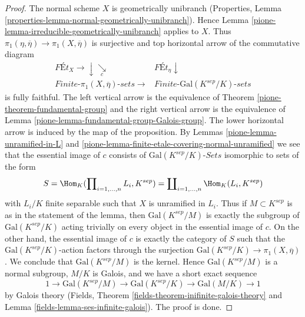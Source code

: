 \begin{proof}

The normal scheme $X$ is geometrically unibranch
(Properties, Lemma \ref{properties-lemma-normal-geometrically-unibranch}).
Hence Lemma \ref{pione-lemma-irreducible-geometrically-unibranch} applies to $X$.
Thus $\pi_1(\eta, \overline{\eta}) \to \pi_1(X, \overline{\eta})$
is surjective and top horizontal arrow of the commutative diagram
$$
\begin{array}{cc}\textit{F\'Et}_X \longrightarrow\downarrow\underset{c}{\searrow} & \textit{F\'Et}_\eta \downarrow \\ \textit{Finite-}\pi_1(X, \overline{\eta})\textit{-sets} \longrightarrow & \textit{Finite-}\text{Gal}(K^{sep}/K)\textit{-sets}\end{array}
$$
is fully faithful. The left vertical arrow is the equivalence of
Theorem \ref{pione-theorem-fundamental-group}
and the right vertical arrow is the equivalence of
Lemma \ref{pione-lemma-fundamental-group-Galois-group}. The lower
horizontal arrow is induced by the map of the proposition.
By Lemmas \ref{pione-lemma-unramified-in-L} and
\ref{pione-lemma-finite-etale-covering-normal-unramified}
we see that the essential image of $c$
consists of $\text{Gal}(K^{sep}/K)\textit{-Sets}$ isomorphic
to sets of the form
$$
S = \Hom_K(\prod\nolimits_{i = 1, \ldots, n} L_i, K^{sep}) =
\coprod\nolimits_{i = 1, \ldots, n} \Hom_K(L_i, K^{sep})
$$
with $L_i/K$ finite separable such that $X$ is unramified in $L_i$.
Thus if $M \subset K^{sep}$ is as in the statement of the lemma,
then $\text{Gal}(K^{sep}/M)$ is exactly the subgroup of
$\text{Gal}(K^{sep}/K)$ acting trivially on every object
in the essential image of $c$. On the other hand, the essential image of $c$
is exactly the category of $S$ such that the $\text{Gal}(K^{sep}/K)$-action
factors through the surjection
$\text{Gal}(K^{sep}/K) \to \pi_1(X, \overline{\eta})$.
We conclude that $\text{Gal}(K^{sep}/M)$ is the kernel.
Hence $\text{Gal}(K^{sep}/M)$ is a normal subgroup, $M/K$ is Galois,
and we have a short exact sequence
$$
1 \to \text{Gal}(K^{sep}/M) \to
\text{Gal}(K^{sep}/K) \to
\text{Gal}(M/K) \to 1
$$
by Galois theory (Fields, Theorem
\ref{fields-theorem-inifinite-galois-theory} and
Lemma \ref{fields-lemma-ses-infinite-galois}). The proof is done.
\end{proof}

